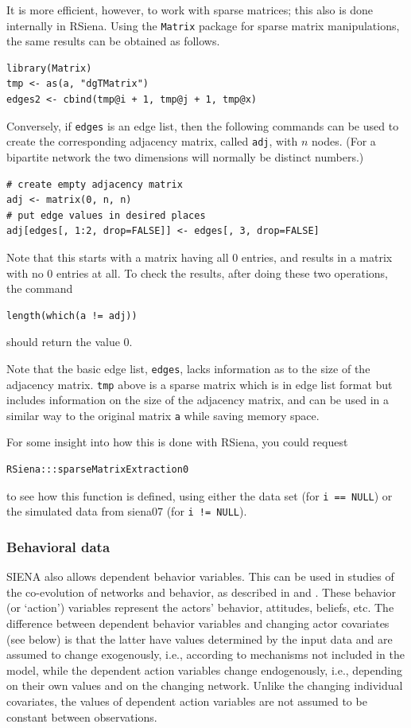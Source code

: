 \documentclass[a4paper,fleqn,11pt]{article}
\newcommand{\+}{\, + \,}
\newcommand{\sfn}[1]{\textsf{#1}}
\newcommand{\rs}{{\sf RSiena}}
\newcommand{\SI}{{\sf SIENA }}
\begin{document}
It is more efficient, however, to work with sparse matrices;
this also is done internally in \rs.
Using the \texttt{Matrix} package for sparse matrix manipulations,
the same results can be obtained as follows.
\begin{verbatim}
library(Matrix)
tmp <- as(a, "dgTMatrix")
edges2 <- cbind(tmp@i + 1, tmp@j + 1, tmp@x)
\end{verbatim}
Conversely, if \texttt{edges} is an edge list, then the following commands
can be used to create the corresponding
adjacency matrix, called \texttt{adj},
with $n$ nodes. (For a bipartite network the two dimensions
will normally be distinct numbers.)
\begin{verbatim}
# create empty adjacency matrix
adj <- matrix(0, n, n)
# put edge values in desired places
adj[edges[, 1:2, drop=FALSE]] <- edges[, 3, drop=FALSE]
\end{verbatim}
Note that this starts with a matrix having all 0 entries,
and results in a matrix with no 0 entries at all.
To check the results, after doing these two operations, the command
\begin{verbatim}
length(which(a != adj))
\end{verbatim}
should return the value 0.

Note that the basic edge list, \verb|edges|, lacks information as to the size of
the adjacency matrix. \verb|tmp| above is a sparse matrix which is in edge list
format but includes information on the size of the adjacency matrix, and can be
used in a similar way to the original matrix \verb|a| while saving memory space.

For some insight into how this is done with \rs, you could request
\begin{verbatim}
RSiena:::sparseMatrixExtraction0
\end{verbatim}
to see how this function is defined, using either the data set (for \texttt{i == NULL})
or the simulated data from \sfn{siena07} (for \texttt{i != NULL}).


\subsubsection{Behavioral data}

\SI also allows dependent behavior variables. This can be used in studies
of the co-evolution of networks and behavior, as described
in \citet*{SnijdersEA07} and \citet*{SteglichEA10}.
These behavior (or `action') variables represent
the actors' behavior, attitudes, beliefs, etc.
The difference between dependent behavior variables and changing actor
covariates (see below) is that the latter
have values determined by the input data and are assumed to
change exogenously, i.e., according
to mechanisms not included in the model, while the dependent
action variables change endogenously, i.e.,
depending on their own values and on the changing network.
Unlike the changing individual covariates,
the values of dependent action variables are not assumed to be
constant between observations.
\end{document}
